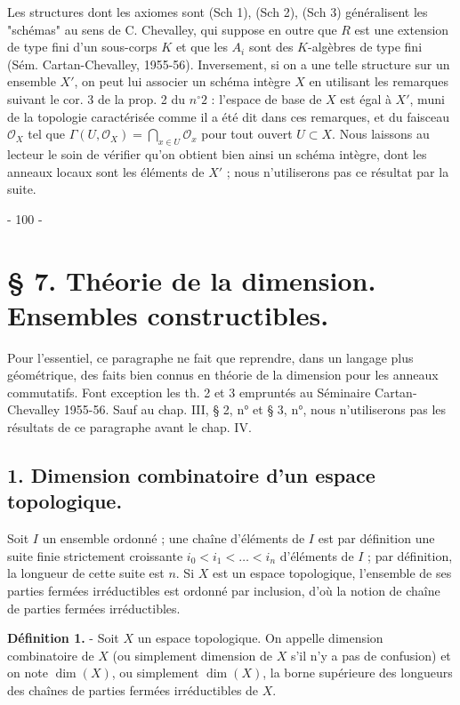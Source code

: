Les structures dont les axiomes sont (Sch 1), (Sch 2), (Sch 3) généralisent les "schémas" au sens de C. Chevalley, qui suppose en outre que $R$ est une extension de type fini d'un sous-corps $K$ et que les $A_i$ sont des $K$-algèbres de type fini (Sém. Cartan-Chevalley, 1955-56). Inversement, si on a une telle structure sur un ensemble $X'$, on peut lui associer un schéma intègre $X$ en utilisant les remarques suivant le cor. 3 de la prop. 2 du $n^\circ 2$ : l'espace de base de $X$ est égal à $X'$, muni de la topologie caractérisée comme il a été dit dans ces remarques, et du faisceau $\mathcal{O}_X$ tel que $\Gamma(U, \mathcal{O}_X) = \bigcap_{x \in U} \mathcal{O}_x$ pour tout ouvert $U \subset X$. Nous laissons au lecteur le soin de vérifier qu'on obtient bien ainsi un schéma intègre, dont les anneaux locaux sont les éléments de $X'$ ; nous n'utiliserons pas ce résultat par la suite.

\newpage



- 100 -

\section*{§ 7. Théorie de la dimension. Ensembles constructibles.}

Pour l'essentiel, ce paragraphe ne fait que reprendre, dans un langage plus géométrique, des faits bien connus en théorie de la dimension pour les anneaux commutatifs. Font exception les th. 2 et 3 empruntés au Séminaire Cartan-Chevalley 1955-56. Sauf au chap. III, § 2, n° et § 3, n°, nous n'utiliserons pas les résultats de ce paragraphe avant le chap. IV.

\subsection*{1. Dimension combinatoire d'un espace topologique.}

Soit $I$ un ensemble ordonné ; une chaîne d'éléments de $I$ est par définition une suite finie strictement croissante $i_0 < i_1 < \dots < i_n$ d'éléments de $I$ ; par définition, la longueur de cette suite est $n$. Si $X$ est un espace topologique, l'ensemble de ses parties fermées irréductibles est ordonné par inclusion, d'où la notion de chaîne de parties fermées irréductibles.

\textbf{Définition 1.} - Soit $X$ un espace topologique. On appelle dimension combinatoire de $X$ (ou simplement dimension de $X$ s'il n'y a pas de confusion) et on note $\dim(X)$, ou simplement $\dim(X)$, la borne supérieure des longueurs des chaînes de parties fermées irréductibles de $X$.

